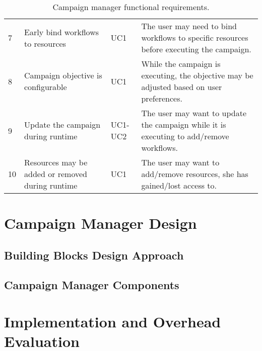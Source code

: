 \begin{table}[t]
\begin{tabular}{@{}p{1.5cm}|p{2.8cm}p{1.5cm}p{6cm}@{}}
         7 & 
         Early bind workflows to resources &
         UC1 &
         The user may need to bind workflows to specific resources before executing the campaign.\\
         8 & 
         Campaign objective is configurable & 
         UC1 & 
         While the campaign is executing, the objective may be adjusted based on user preferences.\\
         9 &
         Update the campaign during runtime &
         UC1-UC2 &
         The user may want to update the campaign while it is executing to add/remove workflows.\\
         10 &
         Resources may be added or removed during runtime & 
         UC1 & 
         The user may want to add/remove resources, she has gained/lost access to.\\
        \bottomrule
    \end{tabular}
    \caption{Campaign manager functional requirements.\label{tab:fun_reqs}}
\end{table}




\section{Campaign Manager Design}
\subsection{Building Blocks Design Approach}
\subsection{Campaign Manager Components}
\section{Implementation and Overhead Evaluation}
